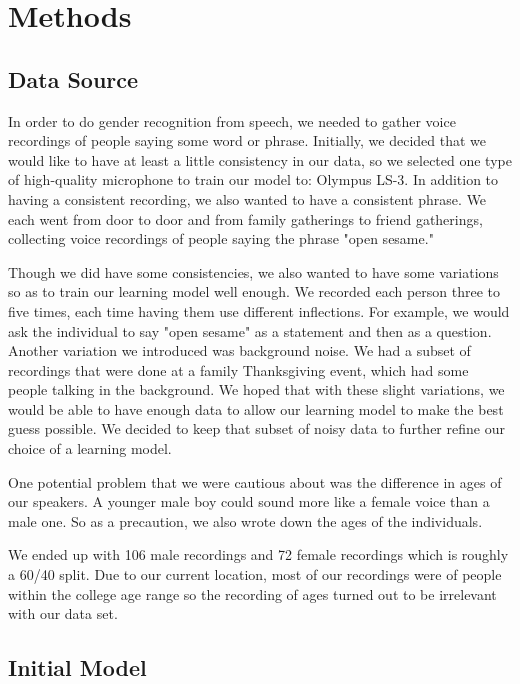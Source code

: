 \documentclass{article}
\begin{document}
\section{Methods}

\subsection{Data Source}

In order to do gender recognition from speech, we needed to gather voice recordings of people saying some word or phrase. Initially, we decided that we would like to have at least a little consistency in our data, so we selected one type of high-quality microphone to train our model to: Olympus LS-3. In addition to having a consistent recording, we also wanted to have a consistent phrase.  We each went from door to door and from family gatherings to friend gatherings, collecting voice recordings of people saying the phrase "open sesame."

Though we did have some consistencies, we also wanted to have some variations so as to train our learning model well enough. We recorded each person three to five times, each time having them use different inflections. For example, we would ask the individual to say "open sesame" as a statement and then as a question. Another variation we introduced was background noise. We had a subset of recordings that were done at a family Thanksgiving event, which had some people talking in the background. We hoped that with these slight variations, we would be able to have enough data to allow our learning model to make the best guess possible. We decided to keep that subset of noisy data to further refine our choice of a learning model.

One potential problem that we were cautious about was the difference in ages of our speakers. A younger male boy could sound more like a female voice than a male one. So as a precaution, we also wrote down the ages of the individuals.

We ended up with 106 male recordings and 72 female recordings which is roughly a 60/40 split. Due to our current location, most of our recordings were of people within the college age range so the recording of ages turned out to be irrelevant with our data set.

\subsection{Initial Model}
\end{document}

